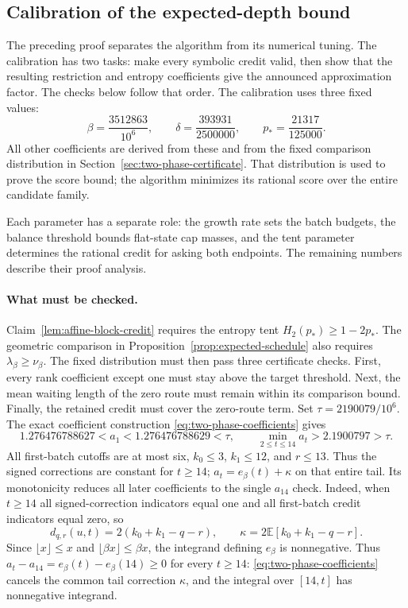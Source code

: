 ﻿\subsection{Calibration of the expected-depth bound}
\label{sec:two-phase}

The preceding proof separates the algorithm from its numerical tuning.
The calibration has two tasks: make every symbolic credit valid,
then show that the resulting restriction and entropy coefficients
give the announced approximation factor. The checks below follow
that order.
The calibration uses three fixed values:
\begin{equation}\label{eq:two-phase-parameters}
 \beta=\frac{3512863}{10^6},\qquad
 \delta=\frac{393931}{2500000},\qquad
 p_*=\frac{21317}{125000}.
\end{equation}
All other coefficients are derived from these and from the fixed
comparison distribution in Section~\ref{sec:two-phase-certificate}.
That distribution is used to prove the score bound; the algorithm
minimizes its rational score over the entire candidate family.

Each parameter has a separate role: the growth rate sets the batch
budgets, the balance threshold bounds flat-state cap masses, and the
tent parameter determines the rational credit for asking both
endpoints. The remaining numbers describe their proof analysis.

\paragraph{What must be checked.}
Claim~\ref{lem:affine-block-credit} requires the entropy tent
$H_2(p_*)\ge1-2p_*$. The geometric comparison in
Proposition~\ref{prop:expected-schedule} also requires
$\lambda_\beta\ge\nu_\beta$. The fixed distribution must then pass
three certificate checks. First, every rank coefficient except one
must stay above the target threshold. Next, the mean waiting length of
the zero route must remain within its comparison bound. Finally, the
retained credit must cover the zero-route term. Set
$\tau=2190079/10^6$. The exact coefficient construction
\eqref{eq:two-phase-coefficients} gives
\[
 1.276476788627<a_1<1.276476788629<\tau,
 \qquad \min_{2\le t\le14}a_t>2.1900797>\tau.
\]
All first-batch cutoffs are at most six, $k_0\le3$, $k_1\le12$,
and $r\le13$. Thus the signed corrections are constant for $t\ge14$;
$a_t=e_\beta(t)+\kappa$ on that entire tail. Its monotonicity reduces
all later coefficients to the single $a_{14}$ check.
Indeed, when $t\ge14$ all signed-correction indicators equal one
and all first-batch credit indicators equal zero, so
\[
 d_{q,r}(u,t)=2(k_0+k_1-q-r),\qquad
 \kappa=2\mathbb E[k_0+k_1-q-r].
\]
Since $\lfloor x\rfloor\le x$ and
$\lfloor\beta x\rfloor\le\beta x$, the integrand defining
$e_\beta$ is nonnegative. Thus
$a_t-a_{14}=e_\beta(t)-e_\beta(14)\ge0$ for every $t\ge14$:
\eqref{eq:two-phase-coefficients} cancels the common tail correction
$\kappa$, and the integral over $[14,t]$ has nonnegative integrand.

